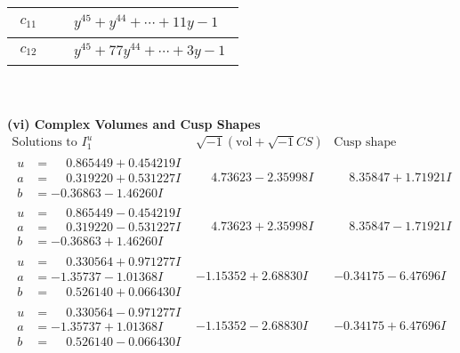 \documentclass[1p]{elsarticle_modified}
\theoremstyle{definition}
\newcommand{\I}{\sqrt{-1}}
\begin{document}
\begin{tabular}{m{50pt}|m{274pt}}
\hline $$\begin{aligned}c_{11}\end{aligned}$$&$\begin{aligned}
&y^{45}+y^{44}+\cdots+11 y-1
\end{aligned}$\\
\hline $$\begin{aligned}c_{12}\end{aligned}$$&$\begin{aligned}
&y^{45}+77 y^{44}+\cdots+3 y-1
\end{aligned}$\\
\hline
\end{tabular}\\~\\
\newpage\flushleft \textbf{(vi) Complex Volumes and Cusp Shapes}
$$\begin{array}{c|c|c}  
\text{Solutions to }I^u_{1}& \I (\text{vol} + \sqrt{-1}CS) & \text{Cusp shape}\\
 \hline 
\begin{aligned}
u &= \phantom{-}0.865449 + 0.454219 I \\
a &= \phantom{-}0.319220 + 0.531227 I \\
b &= -0.36863 - 1.46260 I\end{aligned}
 & \phantom{-}4.73623 - 2.35998 I & \phantom{-}8.35847 + 1.71921 I \\ \hline\begin{aligned}
u &= \phantom{-}0.865449 - 0.454219 I \\
a &= \phantom{-}0.319220 - 0.531227 I \\
b &= -0.36863 + 1.46260 I\end{aligned}
 & \phantom{-}4.73623 + 2.35998 I & \phantom{-}8.35847 - 1.71921 I \\ \hline\begin{aligned}
u &= \phantom{-}0.330564 + 0.971277 I \\
a &= -1.35737 - 1.01368 I \\
b &= \phantom{-}0.526140 + 0.066430 I\end{aligned}
 & -1.15352 + 2.68830 I & -0.34175 - 6.47696 I \\ \hline\begin{aligned}
u &= \phantom{-}0.330564 - 0.971277 I \\
a &= -1.35737 + 1.01368 I \\
b &= \phantom{-}0.526140 - 0.066430 I\end{aligned}
 & -1.15352 - 2.68830 I & -0.34175 + 6.47696 I \\ \hline\begin{aligned}

\end{aligned}
\end{array}$$
\end{document}

